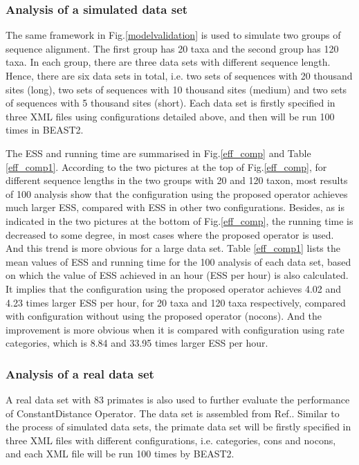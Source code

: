\documentclass{bmcart}
\begin{document}
\subsubsection*{Analysis of a simulated data set}
The same framework in Fig.\ref{modelvalidation} is used to simulate two groups of sequence alignment. The first group has 20 taxa and the second group has 120 taxa. In each group, there are three data sets with different sequence length. Hence, there are six data sets in total, i.e. two sets of  sequences with 20 thousand sites (long), two sets of  sequences with 10 thousand sites (medium) and two sets of sequences with 5 thousand sites (short). Each data set is firstly specified in three XML files using configurations detailed above, and then will be run 100 times in BEAST2. 

The ESS and running time are summarised in Fig.\ref{eff_comp} and Table \ref{eff_comp1}. According to the two pictures at the top of Fig.\ref{eff_comp}, for different sequence lengths in the two groups with 20 and 120 taxon, most results of 100 analysis show that the configuration using the proposed operator achieves much larger ESS, compared with ESS in other two configurations. Besides, as is indicated in the two pictures at the bottom of Fig.\ref{eff_comp}, the running time is decreased to some degree, in most cases where the proposed operator is used. And this trend is more obvious for a large data set. Table \ref{eff_comp1} lists the mean values of ESS and running time for the 100 analysis of each data set, based on which the value of ESS achieved in an hour (ESS per hour) is also calculated. It implies that the configuration using the proposed operator achieves 4.02 and 4.23 times larger ESS per hour, for 20 taxa and 120 taxa respectively, compared with configuration without using the proposed operator (nocons). And the improvement is more obvious when it is compared with configuration using rate categories, which is 8.84 and 33.95 times larger ESS per hour.
\subsubsection*{Analysis of a real data set}
A real data set with 83 primates is also used to further evaluate the performance of ConstantDistance Operator. The data set is assembled from Ref.\cite{finstermeier2013mitogenomic}. Similar to the process of simulated data sets, the primate data set will be firstly specified in three XML files with different configurations, i.e. categories, cons and nocons, and each XML file will be run 100 times by BEAST2. 
\end{document}

